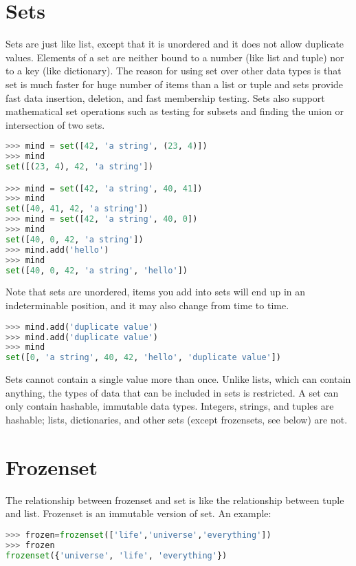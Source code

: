 \section{Sets}
Sets are just like list, except that it is unordered and it does not allow
duplicate values. Elements of a set are neither bound to a number (like list and
tuple) nor to a key (like dictionary). The reason for using set over other data
types is that set is much faster for huge number of items than a list or tuple
and sets provide fast data insertion, deletion, and fast membership testing.
Sets also support mathematical set operations such as testing for subsets and
finding the union or intersection of two sets.
\lstset{basicstyle=\scriptsize, numbers=left, captionpos=b, tabsize=4}
\begin{lstlisting}[caption=Set Definition,language={Python},
xleftmargin=15pt, label=lst:setdefinition]
>>> mind = set([42, 'a string', (23, 4)])
>>> mind
set([(23, 4), 42, 'a string'])

>>> mind = set([42, 'a string', 40, 41])
>>> mind
set([40, 41, 42, 'a string'])
>>> mind = set([42, 'a string', 40, 0])
>>> mind
set([40, 0, 42, 'a string'])
>>> mind.add('hello')
>>> mind
set([40, 0, 42, 'a string', 'hello'])
\end{lstlisting}

Note that sets are unordered, items you add into sets will end up in an
indeterminable position, and it may also change from time to time.
\lstset{basicstyle=\scriptsize, numbers=left, captionpos=b, tabsize=4}
\begin{lstlisting}[caption=Set Insert,language={Python},
xleftmargin=15pt, label=lst:setinsert]
>>> mind.add('duplicate value')
>>> mind.add('duplicate value')
>>> mind
set([0, 'a string', 40, 42, 'hello', 'duplicate value'])
\end{lstlisting}

Sets cannot contain a single value more than once. Unlike lists, which can
contain anything, the types of data that can be included in sets is restricted.
A set can only contain hashable, immutable data types. Integers, strings, and
tuples are hashable; lists, dictionaries, and other sets (except frozensets, see
below) are not.

\section{Frozenset}
The relationship between frozenset and set is like the relationship between
tuple and list. Frozenset is an immutable version of set. An example:
\lstset{basicstyle=\scriptsize, numbers=left, captionpos=b, tabsize=4}
\begin{lstlisting}[caption=Frozenset Definition,language={Python},
xleftmargin=15pt, label=lst:frozensetdefinition]
>>> frozen=frozenset(['life','universe','everything'])
>>> frozen
frozenset({'universe', 'life', 'everything'})
\end{lstlisting}

